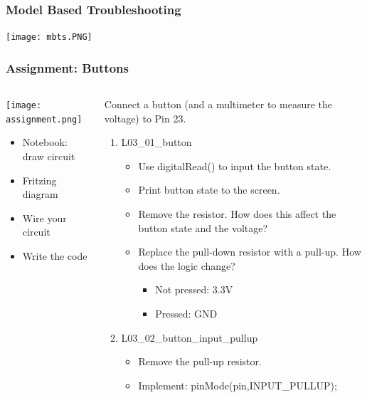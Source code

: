 \documentclass{beamer}
\begin{document}
\begin{frame}\frametitle{Model Based Troubleshooting}
\begin{center}
\texttt{[image: mbts.PNG]}
\end{center}
\end{frame}

\begin{frame}\frametitle{Assignment: Buttons}
\begin{columns}
\begin{column}{4.0cm}
\texttt{[image: assignment.png]}
\begin{itemize}
\item Notebook: draw circuit
\item Fritzing diagram
\item Wire your circuit
\item Write the code
\end{itemize}
\end{column}
\begin{column}{7.3cm}
Connect a button (and a multimeter to measure the voltage) to Pin 23. 
\begin{enumerate}
\item L03\_01\_button
	\begin{itemize}
		\item Use digitalRead() to input the button state.
		\item Print button state to the screen.
		\item Remove the resistor. How does this affect the button state and the voltage?
		\item Replace the pull-down resistor with a pull-up. How does the logic change?
		\begin{itemize}
		\item Not pressed: 3.3V
		\item Pressed: GND
		\end{itemize}
	\end{itemize}
\item L03\_02\_button\_input\_pullup
	\begin{itemize}
		\item Remove the pull-up resistor.
		\item Implement: pinMode(pin,INPUT\_PULLUP);
	\end{itemize}
\end{enumerate}
\end{column}
\end{columns}
\end{frame}
\end{document}
